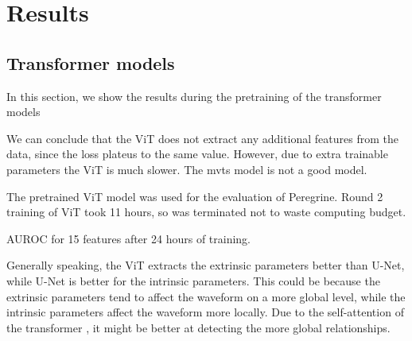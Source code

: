 \section{Results}
\label{sec:results}

\subsection{Transformer models}

In this section, we show the results during the pretraining of the transformer models

We can conclude that the ViT does not extract any additional features from the data, since the loss plateus to the same value. However, due to extra trainable parameters the ViT is much slower. The mvts model is not a good model.

The pretrained ViT model was used for the evaluation of Peregrine. Round 2 training of ViT took 11 hours, so was terminated not to waste computing budget.

AUROC for 15 features after 24 hours of training.

Generally speaking, the ViT extracts the extrinsic parameters better than U-Net, while U-Net is better for the intrinsic parameters. This could be because the extrinsic parameters tend to affect the waveform on a more global level, while the intrinsic parameters affect the waveform more locally. Due to the self-attention of the transformer , it might be better at detecting the more global relationships.



